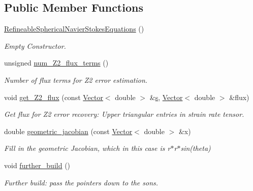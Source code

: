 \subsection*{Public Member Functions}
\begin{DoxyCompactItemize}
\item 
\hyperlink{classoomph_1_1RefineableSphericalNavierStokesEquations_a110ee3e26c415f5ce0b242c810365635}{Refineable\+Spherical\+Navier\+Stokes\+Equations} ()
\begin{DoxyCompactList}\small\item\em Empty Constructor. \end{DoxyCompactList}\item 
unsigned \hyperlink{classoomph_1_1RefineableSphericalNavierStokesEquations_a5b669a851b9bc3dee0c8e483ce771be6}{num\+\_\+\+Z2\+\_\+flux\+\_\+terms} ()
\begin{DoxyCompactList}\small\item\em Number of \textquotesingle{}flux\textquotesingle{} terms for Z2 error estimation. \end{DoxyCompactList}\item 
void \hyperlink{classoomph_1_1RefineableSphericalNavierStokesEquations_ae0b6940ca1e05e042dae71b185e995b5}{get\+\_\+\+Z2\+\_\+flux} (const \hyperlink{classoomph_1_1Vector}{Vector}$<$ double $>$ \&\hyperlink{cfortran_8h_ab7123126e4885ef647dd9c6e3807a21c}{s}, \hyperlink{classoomph_1_1Vector}{Vector}$<$ double $>$ \&flux)
\begin{DoxyCompactList}\small\item\em Get \textquotesingle{}flux\textquotesingle{} for Z2 error recovery\+: Upper triangular entries in strain rate tensor. \end{DoxyCompactList}\item 
double \hyperlink{classoomph_1_1RefineableSphericalNavierStokesEquations_a2705f68643cc0fc85bc31f8b26189b6d}{geometric\+\_\+jacobian} (const \hyperlink{classoomph_1_1Vector}{Vector}$<$ double $>$ \&x)
\begin{DoxyCompactList}\small\item\em Fill in the geometric Jacobian, which in this case is r$\ast$r$\ast$sin(theta) \end{DoxyCompactList}\item 
void \hyperlink{classoomph_1_1RefineableSphericalNavierStokesEquations_acb7ba9bdf812cecd8d1d503000227856}{further\+\_\+build} ()
\begin{DoxyCompactList}\small\item\em Further build\+: pass the pointers down to the sons. \end{DoxyCompactList}\end{DoxyCompactItemize}
